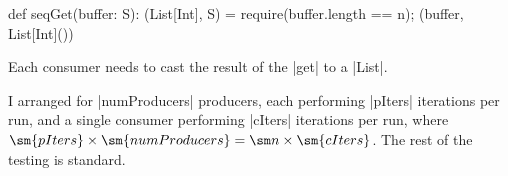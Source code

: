 \begin{answerS}
\begin{scala}
  def seqGet(buffer: S): (List[Int], S) = {
    require(buffer.length == n); (buffer, List[Int]())
  }
\end{scala}
%
Each consumer needs to cast the result of the |get| to a |List|.
%
%
I arranged for |numProducers| producers, each performing |pIters| iterations
per run, and a single consumer performing |cIters| iterations per run, where
$\sm{pIters} \times \sm{numProducers} = \sm n \times \sm{cIters}$.
The rest of the testing is standard.
\end{answerS}
